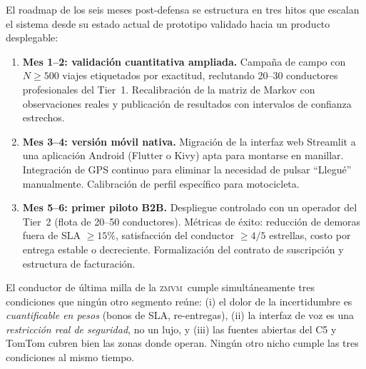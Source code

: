 \documentclass[11pt,a4paper]{article}
\newcommand{\ZMVM}{\textsc{zmvm}}
\begin{document}
El roadmap de los seis meses post-defensa se estructura en tres
hitos que escalan el sistema desde su estado actual de prototipo
validado hacia un producto desplegable:

\begin{enumerate}
\item \textbf{Mes 1--2: validación cuantitativa ampliada.}
Campaña de campo con $N \geq 500$ viajes etiquetados por exactitud,
reclutando \num{20}--\num{30} conductores profesionales del Tier~1.
Recalibración de la matriz de Markov con observaciones reales y
publicación de resultados con intervalos de confianza estrechos.

\item \textbf{Mes 3--4: versión móvil nativa.}
Migración de la interfaz web Streamlit a una aplicación Android
(Flutter o Kivy) apta para montarse en manillar. Integración de GPS
continuo para eliminar la necesidad de pulsar ``Llegué'' manualmente.
Calibración de perfil específico para motocicleta.

\item \textbf{Mes 5--6: primer piloto B2B.}
Despliegue controlado con un operador del Tier~2 (flota de
\num{20}--\num{50} conductores). Métricas de éxito: reducción de
demoras fuera de SLA $\geq 15\%$, satisfacción del conductor
$\geq 4/5$ estrellas, costo por entrega estable o decreciente.
Formalización del contrato de suscripción y estructura de facturación.
\end{enumerate}

\begin{tipbox}
El conductor de última milla de la \ZMVM\ cumple simultáneamente tres
condiciones que ningún otro segmento reúne: (i) el dolor de la
incertidumbre es \emph{cuantificable en pesos} (bonos de SLA,
re-entregas), (ii) la interfaz de voz es una \emph{restricción real de
seguridad}, no un lujo, y (iii) las fuentes abiertas del C5 y TomTom
cubren bien las zonas donde operan. Ningún otro nicho cumple las tres
condiciones al mismo tiempo.
\end{tipbox}
\end{document}
